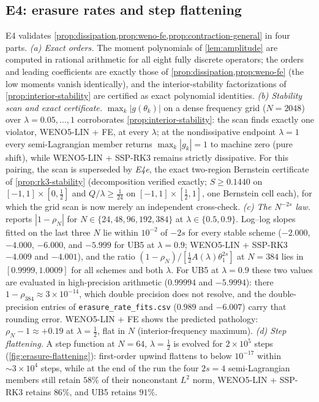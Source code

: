 \documentclass[pdflatex,sn-mathphys-num]{sn-jnl}%
\theoremstyle{thmstyleone}%
\theoremstyle{thmstyletwo}%
\theoremstyle{thmstylethree}%
\begin{document}
\subsection{E4: erasure rates and step flattening}\label{sec:exp-erasure}

E4 validates \cref{prop:dissipation,prop:weno-fe,prop:contraction-general} in four parts.
\emph{(a) Exact orders.}
The moment polynomials of \cref{lem:amplitude} are computed in rational arithmetic for all eight fully discrete operators; the orders and leading coefficients are exactly those of \cref{prop:dissipation,prop:weno-fe} (the low moments vanish identically), and the interior-stability factorizations of \cref{prop:interior-stability} are certified as exact polynomial identities.
\emph{(b) Stability scan and exact certificate.}
$\max_k|g(\theta_k)|$ on a dense frequency grid ($N=2048$) over $\lambda=0.05,\ldots,1$ corroborates \cref{prop:interior-stability}: the scan finds exactly one violator, WENO5-LIN + FE, at every $\lambda$; at the nondissipative endpoint $\lambda=1$ every semi-Lagrangian member returns $\max_k|g_k|=1$ to machine zero (pure shift), while WENO5-LIN + SSP-RK3 remains strictly dissipative.
For this pairing, the scan is superseded by \emph{E4e}, the exact two-region Bernstein certificate of \cref{prop:rk3-stability} (decomposition verified exactly; $S\ge0.1440$ on $[-1,1]\times[0,\tfrac12]$ and $Q/\lambda\ge\tfrac1{24}$ on $[-1,1]\times[\tfrac12,1]$, one Bernstein cell each), for which the grid scan is now merely an independent cross-check.
\emph{(c) The $N^{-2s}$ law.}
 reports $|1-\rho_N|$ for $N\in\{24,48,96,192,384\}$ at $\lambda\in\{0.5,0.9\}$.
Log--log slopes fitted on the last three $N$ lie within $10^{-2}$ of $-2s$ for every stable scheme ($-2.000$, $-4.000$, $-6.000$, and $-5.999$ for UB5 at $\lambda=0.9$; WENO5-LIN + SSP-RK3 $-4.009$ and $-4.001$), and the ratio $(1-\rho_N)/[\tfrac12A(\lambda)\theta_1^{2s}]$ at $N=384$ lies in $[0.9999,1.0009]$ for all schemes and both $\lambda$.
For UB5 at $\lambda=0.9$ these two values are evaluated in high-precision arithmetic ($0.99994$ and $-5.9994$): there $1-\rho_{384}\approx3\times10^{-14}$, which double precision does not resolve, and the double-precision entries of \texttt{erasure\_rate\_fits.csv} ($0.989$ and $-6.007$) carry that rounding error.
WENO5-LIN + FE shows the predicted pathology: $\rho_N-1\approx+0.19$ at $\lambda=\tfrac12$, flat in $N$ (interior-frequency maximum).
\emph{(d) Step flattening.}
A step function at $N=64$, $\lambda=\tfrac12$ is evolved for $2\times10^5$ steps (\cref{fig:erasure-flattening}): first-order upwind flattens to below $10^{-17}$ within $\sim3\times10^4$ steps, while at the end of the run the four $2s=4$ semi-Lagrangian members still retain $58\%$ of their nonconstant $L^2$ norm, WENO5-LIN + SSP-RK3 retains $86\%$, and UB5 retains $91\%$.
\end{document}
